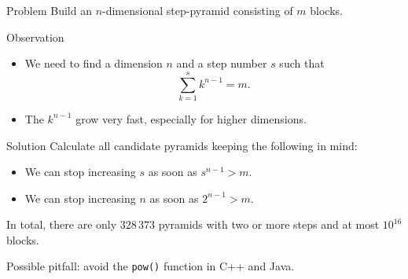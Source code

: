 \begin{slide}
  \begin{block}{Problem}
    Build an $n$-dimensional step-pyramid consisting of $m$ blocks.
  \end{block}
  \pause
  \begin{block}{Observation}
    \begin{itemize}
      \item We need to find a dimension $n$ and a step number $s$ such
        that $$\sum_{k=1}^s k^{n-1} = m.$$
      \item The $k^{n-1}$ grow very fast, especially for higher dimensions.
    \end{itemize}
  \end{block}
\end{slide}
\begin{slide}
  \begin{block}{Solution}
    Calculate all candidate pyramids keeping the following in mind:
    \begin{itemize}
      \item We can stop increasing $s$ as soon as $s^{n-1} > m$.
      \item We can stop increasing $n$ as soon as $2^{n-1} > m$.
    \end{itemize}
    In total, there are only $328\,373$ pyramids with two or more steps and at most $10^{16}$ blocks.
    
    Possible pitfall: avoid the \texttt{pow()} function in C++ and Java.
  \end{block}
\end{slide}
